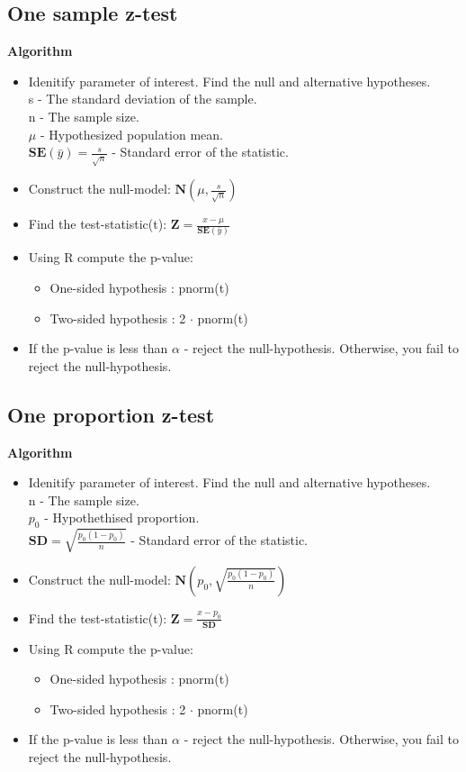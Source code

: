\documentclass{article}
\begin{document}
\subsection{One sample z-test}
\textbf{Algorithm}
\begin{itemize}
\item Idenitify parameter of interest. Find the null and alternative hypotheses.\\
      s - The standard deviation of the sample.\\
      n - The sample size.\\
      $\mu$ - Hypothesized population mean.\\
      $\mathbf{SE}(\bar{y}) = \frac{s}{\sqrt{n}}$ - Standard error of the statistic.
\item Construct the null-model: $\mathbf{N}(\mu,\frac{s}{\sqrt{n}})$
\item Find the test-statistic(t): $\mathbf{Z} = \frac{x-\mu}{\mathbf{SE}(\bar{y})}$
\item Using R compute the p-value:
\begin{itemize}
    \item One-sided hypothesis : pnorm(t)
    \item Two-sided hypothesis : 2 $\cdot$ pnorm(t)
\end{itemize}
\item If the p-value is less than $\alpha$ - reject the null-hypothesis. 
    Otherwise, you fail to reject the null-hypothesis.
\end{itemize}
\subsection{One proportion z-test}
\textbf{Algorithm}
\begin{itemize}
\item Idenitify parameter of interest. Find the null and alternative hypotheses.\\
      n - The sample size.\\
      $p_0$ - Hypothethised proportion.\\
      $\mathbf{SD} = \sqrt{\frac{p_0(1-p_0)}{n}}$ - Standard error of the statistic.
\item Construct the null-model: $\mathbf{N}(p_0,\sqrt{\frac{p_0(1-p_0)}{n}})$
\item Find the test-statistic(t): $\mathbf{Z} = \frac{x-p_0}{\mathbf{SD}}$
\item Using R compute the p-value:
\begin{itemize}
    \item One-sided hypothesis : pnorm(t)
    \item Two-sided hypothesis : 2 $\cdot$ pnorm(t)
\end{itemize}
\item If the p-value is less than $\alpha$ - reject the null-hypothesis. 
    Otherwise, you fail to reject the null-hypothesis.
\end{itemize}
\end{document}
